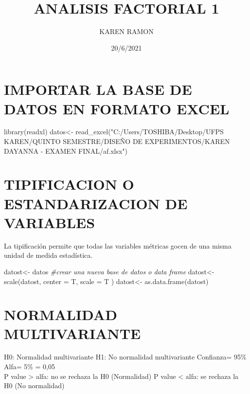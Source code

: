 \documentclass[
]{article}
\title{ANALISIS FACTORIAL 1}
\author{KAREN RAMON}
\date{20/6/2021}
\newenvironment{Shaded}{\begin{snugshade}}{\end{snugshade}}
\newcommand{\AttributeTok}[1]{\textcolor[rgb]{0.77,0.63,0.00}{#1}}
\newcommand{\CommentTok}[1]{\textcolor[rgb]{0.56,0.35,0.01}{\textit{#1}}}
\newcommand{\FunctionTok}[1]{\textcolor[rgb]{0.00,0.00,0.00}{#1}}
\newcommand{\NormalTok}[1]{#1}
\newcommand{\OtherTok}[1]{\textcolor[rgb]{0.56,0.35,0.01}{#1}}
\newcommand{\StringTok}[1]{\textcolor[rgb]{0.31,0.60,0.02}{#1}}
\begin{document}
\maketitle

\hypertarget{importar-la-base-de-datos-en-formato-excel}{%
\section{IMPORTAR LA BASE DE DATOS EN FORMATO
EXCEL}\label{importar-la-base-de-datos-en-formato-excel}}

\begin{Shaded}
\begin{Highlighting}[]
\FunctionTok{library}\NormalTok{(readxl)}
\NormalTok{datos}\OtherTok{\textless{}{-}} \FunctionTok{read\_excel}\NormalTok{(}\StringTok{"C:/Users/TOSHIBA/Desktop/UFPS KAREN/QUINTO SEMESTRE/DISEÑO DE EXPERIMENTOS/KAREN DAYANNA {-} EXAMEN FINAL/af.xlsx"}\NormalTok{)}
\end{Highlighting}
\end{Shaded}

\hypertarget{tipificacion-o-estandarizacion-de-variables}{%
\section{TIPIFICACION O ESTANDARIZACION DE
VARIABLES}\label{tipificacion-o-estandarizacion-de-variables}}

La tipificación permite que todas las variables métricas gocen de una
misma unidad de medida estadística.

\begin{Shaded}
\begin{Highlighting}[]
\NormalTok{datost}\OtherTok{\textless{}{-}}\NormalTok{ datos }\CommentTok{\#crear una nueva base de datos o data frame}
\NormalTok{datost}\OtherTok{\textless{}{-}} \FunctionTok{scale}\NormalTok{(datost, }\AttributeTok{center =}\NormalTok{ T, }\AttributeTok{scale =}\NormalTok{ T )}
\NormalTok{datost}\OtherTok{\textless{}{-}} \FunctionTok{as.data.frame}\NormalTok{(datost)}
\end{Highlighting}
\end{Shaded}

\hypertarget{normalidad-multivariante}{%
\section{NORMALIDAD MULTIVARIANTE}\label{normalidad-multivariante}}

H0: Normalidad multivariante H1: No normalidad multivariante Confianza=
95\%\\
Alfa= 5\% = 0,05\\
P value \textgreater{} alfa: no se rechaza la H0 (Normalidad) P value
\textless{} alfa: se rechaza la H0 (No normalidad)
\end{document}

